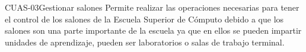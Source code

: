 \begin{UseCase}{CUAS-03}{Gestionar salones}{
	Permite realizar las operaciones necesarias para tener el control de los salones de la Escuela Superior de Cómputo debido a que los salones son una parte importante de la escuela ya que en ellos se pueden impartir unidades de aprendizaje, pueden ser laboratorios o salas de trabajo terminal. \\
    }


%			


\end{UseCase}
